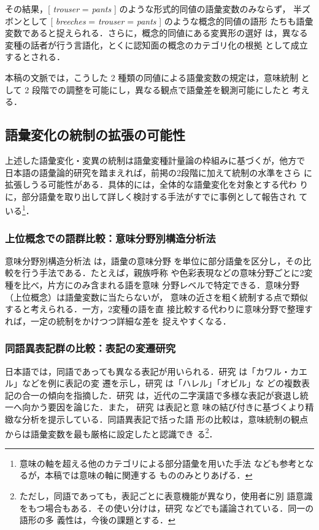 \documentclass[submit]{ipsj}
\begin{document}
その結果，[ \emph{trouser} = \emph{pants} ] のような形式的同値の語彙変数のみならず，
半ズボンとして [ \emph{breeches} = \emph{trouser} = \emph{pants} ] のような概念的同値の語形
たちも語彙変数であると捉えられる．さらに，概念的同値にある変異形の選好
は，異なる変種の話者が行う言語化，とくに認知面の概念のカテゴリ化の根拠
として成立するとされる\cite{DePascale2019Tokenbased}．

本稿の文脈では，こうした 2 種類の同値による語彙変数の規定は，意味統制
として 2 段階での調整を可能にし，異なる観点で語彙差を観測可能にしたと
考える．
\subsection{語彙変化の統制の拡張の可能性\label{org9ed93b8}}
\label{sec:orgc89d348}
上述した語彙変化・変異の統制は語彙変種計量論の枠組みに基づくが，他方で
日本語の語彙論的研究を踏まえれば，前掲の2段階に加えて統制の水準をさら
に拡張しうる可能性がある．具体的には，全体的な語彙変化を対象とする代わ
りに，部分語彙を取り出して詳しく検討する手法がすでに事例として報告され
ている\footnote{意味の軸を超える他のカテゴリによる部分語彙を用いた手法
\cite{ito2008Goi} なども参考となるが，本稿では意味の軸に関連する
もののみとりあげる．}．
\subsubsection{上位概念での語群比較：意味分野別構造分析法}
\label{sec:orge3bc3fb}
意味分野別構造分析法 \cite{tajima2000Goikenkyu} は，語彙の意味分野
を単位に部分語彙を区分し，その比較を行う手法である．たとえば，親族呼称
や色彩表現などの意味分野ごとに2変種を比べ，片方にのみ含まれる語を意味
分野レベルで特定できる．意味分野（上位概念）は語彙変数に当たらないが，
意味の近さを粗く統制する点で類似すると考えられる．一方，2変種の語を直
接比較する代わりに意味分野で整理すれば，一定の統制をかけつつ詳細な差を
捉えやすくなる．
\subsubsection{同語異表記群の比較：表記の変遷研究}
\label{sec:orgcc3fc69}
日本語では，同語であっても異なる表記が用いられる．研究
\cite{takahashi2019Kindai} は「カワル・カエル」などを例に表記の変
遷を示し，研究 \cite{takahashi2016Kindai} は「ハレル」「オビル」な
どの複数表記の合一の傾向を指摘した．研究 \cite{mabuchi2016Kindai}
は，近代の二字漢語で多様な表記が衰退し統一へ向かう要因を論じた．また，
研究 \cite{takahashi2016Kindai,takahashi2019Kindai} は表記と意
味の結び付きに基づくより精緻な分析を提示している．同語異表記で括った語
形の比較は，意味統制の観点からは語彙変数を最も厳格に設定したと認識でき
る\footnote{ただし，同語であっても，表記ごとに表意機能が異なり，使用者に別
語意識をもつ場合もある．その使い分けは，研究
\cite{takahashi2025Tango} などでも議論されている．同一の語形の多
義性は，今後の課題とする．}．
\end{document}
